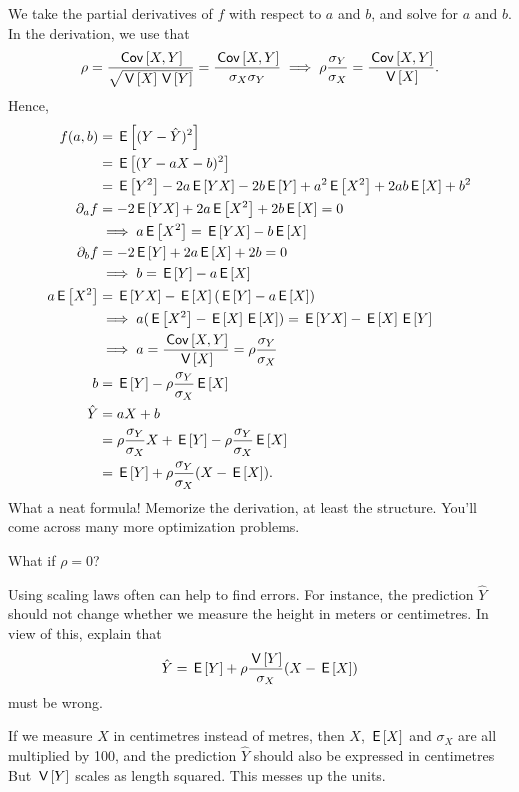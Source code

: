 \begin{exercise}
\begin{solution}
We take the partial derivatives of $f$ with respect to $a$ and $b$, and solve for $a$ and $b$. In the derivation, we use that
\begin{align}
  \label{eq:6}
\rho = \frac{\cov{X,Y}}{\sqrt{\V X \V Y}} = \frac{\cov{X,Y}}{\sigma_X \sigma_Y} \implies  \rho \frac{\sigma_{Y}}{\sigma_{X}} = \frac{\cov{X,Y}}{\V X}.
\end{align}
Hence,
  \begin{align*}
f(a,b) &= \,\mathsf{E}\left[(Y-\hat Y)^2\right] \\
 &= \,\mathsf{E}\left[(Y-a X - b)^2\right] \\
 &= \,\mathsf{E}\left[Y^{2}\right] - 2a\,\mathsf{E}\left[YX\right] - 2b\,\mathsf{E}\left[Y\right] + a^{2}\,\mathsf{E}\left[X^2\right] + 2 ab \,\mathsf{E}\left[X\right] + b^{2}\\
\partial_{a} f &=-2 \,\mathsf{E}\left[YX\right] + 2a \,\mathsf{E}\left[X^2\right] + 2 b \,\mathsf{E}\left[X\right] = 0 \\
&\implies a \,\mathsf{E}\left[X^2\right] =  \,\mathsf{E}\left[YX\right]  -  b \,\mathsf{E}\left[X\right] \\
\partial_{b} f &=-2 \,\mathsf{E}\left[Y\right]  + 2 a \,\mathsf{E}\left[X\right]  + 2 b= 0 \\
& \implies  b = \,\mathsf{E}\left[Y\right] - a \,\mathsf{E}\left[X\right]\\
a \,\mathsf{E}\left[X^2\right] &=  \,\mathsf{E}\left[YX\right]  -  \,\mathsf{E}\left[X\right] (\,\mathsf{E}\left[Y\right] - a \,\mathsf{E}\left[X\right]) \\
&\implies  a (\,\mathsf{E}\left[X^{2}\right] - \,\mathsf{E}\left[X\right] \,\mathsf{E}\left[X\right])  = \,\mathsf{E}\left[YX\right] - \,\mathsf{E}\left[X\right] \,\mathsf{E}\left[Y\right]  \\
&\implies a = \frac{\,\mathsf{Cov}\left[X,Y\right]}{\,\mathsf{V}\left[X\right]} = \rho \frac{\sigma_Y}{\sigma_X}\\
b &= \,\mathsf{E}\left[Y\right] - \rho \frac{\sigma_Y}{\sigma_X}\,\mathsf{E}\left[X\right]\\
\hat Y &= a X + b \\
&= \rho \frac{\sigma_Y}{\sigma_X} X + \,\mathsf{E}\left[Y\right] - \rho\frac{\sigma_Y}{\sigma_X} \,\mathsf{E}\left[X\right] \\
&=  \,\mathsf{E}\left[Y\right] + \rho \frac{\sigma_Y}{\sigma_X} (X-\,\mathsf{E}\left[X\right]).
  \end{align*}
What a neat formula! Memorize the derivation, at least the structure. You'll come across many more optimization problems.

What if $\rho=0$?
\end{solution}
\end{exercise}

\begin{exercise}
Using scaling laws often can help to find errors. For instance,  the prediction $\hat Y$ should not change whether we measure the height in meters or centimetres.
In view of this, explain that
\begin{align*}
  \hat Y = \,\mathsf{E}\left[Y\right] + \rho \frac{\,\mathsf{V}\left[Y\right]}{\sigma_X} (X - \,\mathsf{E}\left[X\right])
\end{align*}
must be wrong.
\begin{solution}
  If we measure $X$ in centimetres instead of metres, then $X$, $\,\mathsf{E}\left[X\right]$ and $\sigma_X$ are all multiplied by 100, and the prediction $\hat Y$ should also be expressed in centimetres But $\,\mathsf{V}\left[Y\right] $ scales as length squared.
  This messes up the units.
\end{solution}
\end{exercise}




